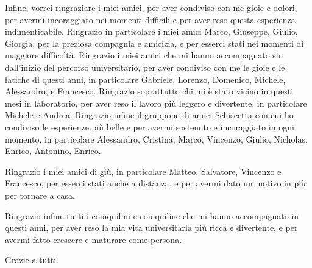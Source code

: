 \documentclass{headers/polimi_3i}
\begin{document}
Infine, vorrei ringraziare i miei amici, per aver condiviso con me gioie e dolori, per avermi incoraggiato nei momenti
difficili e per aver reso questa esperienza indimenticabile. Ringrazio in particolare i miei amici Marco, Giuseppe, Giulio,
Giorgia, per la preziosa compagnia e amicizia, e per esserci stati nei momenti di maggiore difficoltà.
Ringrazio i miei amici che mi hanno accompagnato sin dall'inizio del percorso universitario, per aver condiviso con me
le gioie e le fatiche di questi anni, in particolare Gabriele, Lorenzo, Domenico, Michele, Alessandro, e Francesco.
Ringrazio soprattutto chi mi è stato vicino in questi mesi in laboratorio, per aver reso il lavoro più leggero e divertente,
in particolare Michele e Andrea. Ringrazio infine il gruppone di amici Schiscetta con cui ho condiviso le esperienze più belle e
per avermi sostenuto e incoraggiato in ogni momento, in particolare Alessandro, Cristina, Marco, Vincenzo,
Giulio, Nicholas, Enrico, Antonino, Enrico.

Ringrazio i miei amici di giù, in particolare Matteo, Salvatore, Vincenzo e Francesco, per esserci stati anche a distanza,
e per avermi dato un motivo in più per tornare a casa.

Ringrazio infine tutti i coinquilini e coinquiline che mi hanno accompagnato in questi anni, per aver reso la mia vita
universitaria più ricca e divertente, e per avermi fatto crescere e maturare come persona.

Grazie a tutti.

\cleardoublepage
\end{document}
